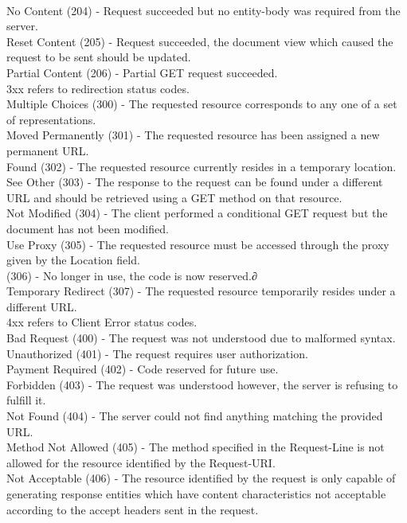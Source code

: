 \documentclass[titlepage]{article}
\begin{document}
\\
No Content (204) - Request succeeded but no entity-body was required from the server.
\\
Reset Content (205) - Request succeeded, the document view which caused the request to be sent should be updated.
\\
Partial Content (206) - Partial GET request succeeded.
\\
3xx refers to redirection status codes.
\\
Multiple Choices (300) - The requested resource corresponds to any one of a set of representations.
\\
Moved Permanently (301) - The requested resource has been assigned a new permanent URL.
\\
Found (302) - The requested resource currently resides in a temporary location.
\\
See Other (303) - The response to the request can be found under a different URL and should be retrieved using a GET method on that resource.
\\
Not Modified (304) - The client performed a conditional GET request but the document has not been modified.
\\
Use Proxy (305) - The requested resource must be accessed through the proxy given by the Location field.
\\
(306) - No longer in use, the code is now reserved.∂
\\
Temporary Redirect (307) - The requested resource temporarily resides under a different URL.
\\
4xx refers to Client Error status codes.
\\
Bad Request (400) - The request was not understood due to malformed syntax.
\\
Unauthorized (401) - The request requires user authorization.
\\
Payment Required (402) - Code reserved for future use.
\\
Forbidden (403) - The request was understood however, the server is refusing to fulfill it.
\\
Not Found (404) - The server could not find anything matching the provided URL.
\\
Method Not Allowed (405) - The method specified in the Request-Line is not allowed for the resource identified by the Request-URI.
\\
Not Acceptable (406) - The resource identified by the request is only capable of generating response entities which have content characteristics not acceptable according to the accept headers sent in the request.
\end{document}
